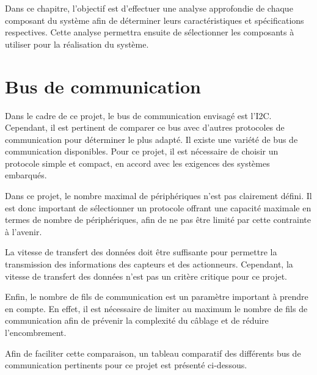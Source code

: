 Dans ce chapitre, l'objectif est d'effectuer une analyse approfondie de chaque composant du système afin de déterminer leurs caractéristiques et spécifications respectives.
Cette analyse permettra ensuite de sélectionner les composants à utiliser pour la réalisation du système.

\section{Bus de communication}

Dans le cadre de ce projet, le bus de communication envisagé est l'I2C.
Cependant, il est pertinent de comparer ce bus avec d'autres protocoles de communication pour déterminer le plus adapté.
Il existe une variété de bus de communication disponibles.
Pour ce projet, il est nécessaire de choisir un protocole simple et compact, en accord avec les exigences des systèmes embarqués.

Dans ce projet, le nombre maximal de périphériques n'est pas clairement défini.
Il est donc important de sélectionner un protocole offrant une capacité maximale en termes de nombre de périphériques, afin de ne pas être limité par cette contrainte à l'avenir.

La vitesse de transfert des données doit être suffisante pour permettre la transmission des informations des capteurs et des actionneurs.
Cependant, la vitesse de transfert des données n'est pas un critère critique pour ce projet.

Enfin, le nombre de fils de communication est un paramètre important à prendre en compte.
En effet, il est nécessaire de limiter au maximum le nombre de fils de communication afin de prévenir la complexité du câblage et de réduire l'encombrement.

Afin de faciliter cette comparaison, un tableau comparatif des différents bus de communication pertinents pour ce projet est présenté ci-dessous.

